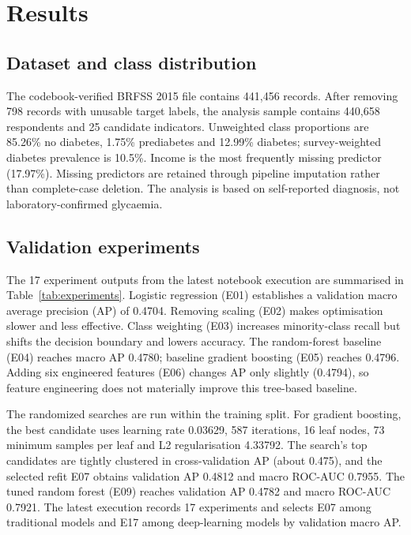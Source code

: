 \section{Results}
\label{sec:results}

\subsection{Dataset and class distribution}
The codebook-verified BRFSS 2015 file contains 441,456 records. After removing 798 records with unusable target labels, the analysis sample contains 440,658 respondents and 25 candidate indicators. Unweighted class proportions are 85.26\% no diabetes, 1.75\% prediabetes and 12.99\% diabetes; survey-weighted diabetes prevalence is 10.5\%. Income is the most frequently missing predictor (17.97\%). Missing predictors are retained through pipeline imputation rather than complete-case deletion. The analysis is based on self-reported diagnosis, not laboratory-confirmed glycaemia.



\subsection{Validation experiments}
The 17 experiment outputs from the latest notebook execution are summarised in Table~\ref{tab:experiments}. Logistic regression (E01) establishes a validation macro average precision (AP) of 0.4704. Removing scaling (E02) makes optimisation slower and less effective. Class weighting (E03) increases minority-class recall but shifts the decision boundary and lowers accuracy. The random-forest baseline (E04) reaches macro AP 0.4780; baseline gradient boosting (E05) reaches 0.4796. Adding six engineered features (E06) changes AP only slightly (0.4794), so feature engineering does not materially improve this tree-based baseline.

The randomized searches are run within the training split. For gradient boosting, the best candidate uses learning rate 0.03629, 587 iterations, 16 leaf nodes, 73 minimum samples per leaf and L2 regularisation 4.33792. The search's top candidates are tightly clustered in cross-validation AP (about 0.475), and the selected refit E07 obtains validation AP 0.4812 and macro ROC-AUC 0.7955. The tuned random forest (E09) reaches validation AP 0.4782 and macro ROC-AUC 0.7921. The latest execution records 17 experiments and selects E07 among traditional models and E17 among deep-learning models by validation macro AP.

